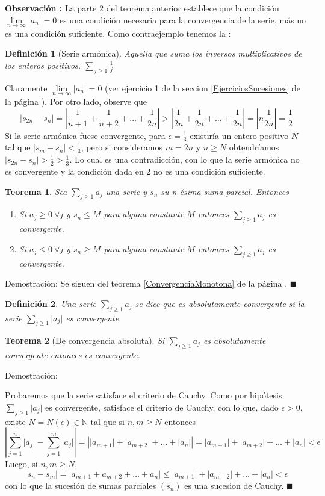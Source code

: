 \documentclass[12pt]{book}
\newcommand\N{{\mathbb N}}
\newcommand{\fullref}[1]{\ref{#1} de la página \pageref{#1}}
\providecommand{\abs}[1]{\lvert#1\rvert}
\newtheorem{teo}{Teorema}[section]
\newtheorem{defi}{Definición}[section]
\begin{document}
\textbf{Observación :} La parte 2 del teorema anterior establece que la condición $\lim\limits_{n\to\infty}\abs{a_n}=0$ es una condición necesaria para la convergencia de la serie, más no es una condición suficiente. Como contraejemplo tenemos la :
\begin{defi}[Serie armónica]\rm
Aquella que suma los inversos multiplicativos de los enteros positivos. $\sum_{j \ge 1}\frac{1}{j}$
\end{defi}
Claramente $\lim\limits_{n\to\infty}\abs{a_n}=0$ (ver ejercicio 1 de la seccion \fullref{EjerciciosSucesiones}). Por otro lado, observe que $$\abs{s_{2n}-s_n}=\left |\frac{1}{n+1}+\frac{1}{n+2}+\dots+\frac{1}{2n}\right|>\left|\frac{1}{2n}+\frac{1}{2n}+\dots+\frac{1}{2n}\right|=\left|n\frac{1}{2n}\right|=\frac{1}{2}$$
Si la serie armónica fuese convergente, para $\epsilon=\frac{1}{3}$ existiría un entero positivo $N$ tal que $\abs{s_m-s_n}<\frac{1}{3}$, pero si consideramos $m=2n$ y $n \ge N$ obtendríamos $\abs{s_{2n}-s_n}>\frac{1}{2}>\frac{1}{3}$. Lo cual es una contradicción, con lo que la serie armónica no es convergente y la condición dada en 2 no es una condición suficiente.
\begin{teo}\label{CauchySeries}\rm
Sea $\sum_{j \ge 1} a_j$ una serie y $s_n$ su n-ésima suma parcial. Entonces 
\begin{enumerate}
    \item Si $a_j \ge 0 \ \forall{j}$ y $s_n \le M$ para alguna constante $M$ entonces $\sum_{j \ge 1} a_j$ es convergente.
    \item Si $a_j \le 0 \ \forall{j}$ y $s_n \ge M$ para alguna constante $M$ entonces $\sum_{j \ge 1} a_j$ es convergente.
\end{enumerate}
\end{teo}
Demostración: Se siguen del teorema \fullref{ConvergenciaMonotona}. $\blacksquare$
\begin{defi}\rm
Una serie $\sum_{j \ge 1} a_j$ se dice que es absolutamente convergente si la serie $\sum_{j \ge 1} \abs{a_j}$ es convergente.
\end{defi}
\begin{teo}[De convergencia absoluta]\label{convergenciaAbs}\rm
Si $\sum_{j \ge 1} a_j$ es absolutamente convergente entonces es convergente.
\end{teo}
Demostración:

Probaremos que la serie satisface el criterio de Cauchy. Como por hipótesis $\sum_{j \ge 1} \abs{a_j}$ es convergente, satisface el criterio de Cauchy, con lo que, dado $\epsilon >0$, existe $N=N(\epsilon) \in \N$ tal que si $n,m \ge N$ entonces $$\left| \sum_{j=1}^n \abs{a_j} - \sum_{j=1}^m \abs{a_j}\right| = \left|\abs{a_{m+1}}+\abs{a_{m+2}}+ \dots +\abs{a_n} \right| = \abs{a_{m+1}}+\abs{a_{m+2}}+ \dots +\abs{a_n} < \epsilon$$
Luego, si $n,m \ge N$, $$\abs{s_n-s_m}=\abs{a_{m+1}+a_{m+2}+\dots+a_n}\le\abs{a_{m+1}}+\abs{a_{m+2}}+\dots+\abs{a_n}<\epsilon$$
con lo que la sucesión de sumas parciales $(s_n)$ es una sucesion de Cauchy. $\blacksquare$
\end{document}
